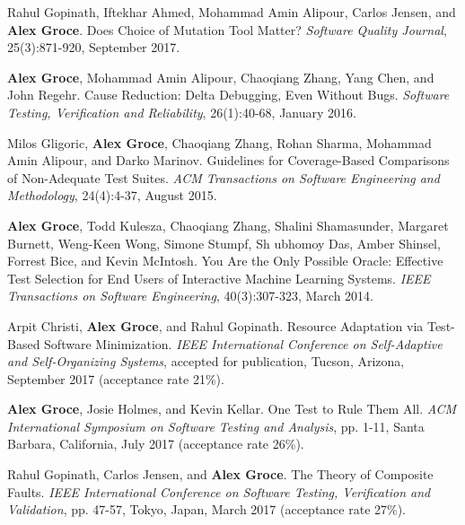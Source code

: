 \documentclass[ComputerScience,10pt]{vita}
\begin{document}
\begin{vita}
\begin{Selected Recent Journal Publications}
\item
Rahul Gopinath, Iftekhar Ahmed, Mohammad Amin Alipour, Carlos Jensen, and {\bf Alex Groce}.
\newblock Does Choice of Mutation Tool Matter?
\newblock \emph{Software Quality Journal}, 25(3):871-920, September 2017.

\item
{\bf Alex Groce}, Mohammad Amin Alipour, Chaoqiang Zhang, Yang Chen, and John Regehr.
\newblock Cause Reduction: Delta Debugging, Even Without Bugs.
\newblock \emph{Software Testing, Verification and Reliability}, 26(1):40-68, January 2016.

\item
Milos Gligoric, {\bf Alex Groce}, Chaoqiang Zhang, Rohan Sharma, Mohammad Amin Alipour, and Darko Marinov.
\newblock Guidelines for Coverage-Based Comparisons of Non-Adequate Test Suites.
\newblock \emph{ACM Transactions on Software Engineering and Methodology}, 24(4):4-37, August 2015.

\item
{\bf Alex Groce}, Todd Kulesza, Chaoqiang Zhang, Shalini Shamasunder, Margaret Burnett, Weng-Keen Wong, Simone Stumpf, Sh
ubhomoy Das, Amber Shinsel, Forrest Bice, and Kevin McIntosh.
\newblock You Are the Only Possible Oracle: Effective Test Selection for End Users of Interactive Machine Learning Systems.
\newblock \emph{IEEE Transactions on Software Engineering}, 40(3):307-323, March 2014.
\end{Selected Recent Journal Publications}

\begin{Selected Recent Conference Publications}
\item Arpit Christi, {\bf Alex Groce}, and Rahul Gopinath.
\newblock Resource Adaptation via Test-Based Software Minimization.
\newblock \emph{IEEE International Conference on Self-Adaptive and Self-Organizing Systems}, accepted for publication, Tucson, Arizona, September 2017 (acceptance rate 21\%).

\item {\bf Alex Groce}, Josie Holmes, and Kevin Kellar.
\newblock One Test to Rule Them All.
\newblock \emph{ACM International Symposium on Software Testing and Analysis}, pp. 1-11, Santa Barbara, California, July 2017 (acceptance rate 26\%).

\item Rahul Gopinath, Carlos Jensen, and {\bf Alex Groce}.
\newblock The Theory of Composite Faults.
\newblock \emph{IEEE International Conference on Software Testing, Verification and Validation}, pp. 47-57, Tokyo, Japan, March 2017 (acceptance rate 27\%).


\end{Selected Recent Conference Publications}
\end{vita}
\end{document}
